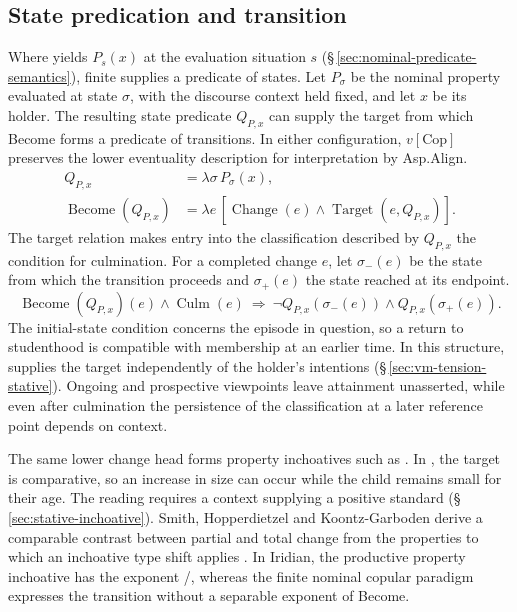 \subsection{State predication and transition}

Where  yields $P_s(x)$ at the evaluation situation $s$
(§\,\ref{sec:nominal-predicate-semantics}), finite 
supplies a predicate of states. Let $P_\sigma$ be the nominal property
evaluated at state $\sigma$, with the discourse context held fixed,
and let $x$ be its holder. The resulting state predicate $Q_{P,x}$
can supply the target from which Become forms a predicate of
transitions. In either configuration, $v[\mathrm{Cop}]$ preserves the
lower eventuality description for interpretation by Asp.Align.
\[
\begin{aligned}
 Q_{P,x}&=\lambda\sigma\,P_\sigma(x),\\
 \operatorname{Become}(Q_{P,x})
   &=\lambda e\,[\operatorname{Change}(e)
          \land\operatorname{Target}(e,Q_{P,x})].
\end{aligned}
\]
The target relation makes entry into the classification described
by $Q_{P,x}$ the condition for culmination. For a completed change $e$,
let $\sigma_-(e)$ be the state from which the transition proceeds
and $\sigma_+(e)$ the state reached at its endpoint.
\[
 \operatorname{Become}(Q_{P,x})(e)\land\operatorname{Culm}(e)
 \ \Rightarrow\
 \neg Q_{P,x}(\sigma_-(e))\land Q_{P,x}(\sigma_+(e)).
\]
The initial-state condition concerns the episode in question, so a
return to studenthood is compatible with membership at an earlier time.
In this structure, \synhead{StateP} supplies the target independently
of the holder's intentions (§\,\ref{sec:vm-tension-stative}).
Ongoing and prospective viewpoints leave attainment unasserted, while
even after culmination the persistence of the classification at a
later reference point depends on context.

The same lower change head forms property inchoatives such as
 . In 
, the target is comparative, so
an increase in size can occur while the child remains small for
their age. The reading  requires
a context supplying a positive standard (§\,\ref{sec:stative-inchoative}).
Smith, Hopperdietzel and Koontz-Garboden derive a comparable contrast
between partial and total change from the properties to which an
inchoative type shift applies
\cite[§§2.1, 5.1]{smithhopperdietzelkoontzgarboden2025}. In Iridian,
the productive property inchoative has the exponent \ird{-el-}/,
whereas the finite nominal copular paradigm expresses the transition
without a separable exponent of Become.

